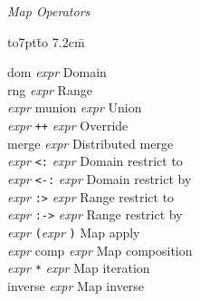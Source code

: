 \documentclass[a4paper]{jsarticle}
\newcommand{\keyw}[1]{{\sf #1}}
\newcommand{\K}[1]{{\sf #1}}
\newcommand{\id}[1]{{\it #1\/}}
\newcommand{\lp}{{\tt(}}
\newcommand{\rp}{{\tt)}}
\newenvironment{tabbingone}[0]{
\begingroup
  \parskip=0pt
  \topsep=0pt
  \partopsep=0pt
  \begin{tabbing}
    \hbox to7pt{}\=%
    \hbox to 7.2cm{}\=%
    \kill
    \+ %
    \kill
}{
  \end{tabbing}
\endgroup}
\begin{document}
\id{Map Operators}
\begin{tabbingone}

      \K{dom} \id{expr}\> Domain    \\%
      \K{rng} \id{expr}\> Range  \\%
      \id{expr} \K{munion} \id{expr}\> Union     \\%
      \id{expr} {\tt++} \id{expr}\> Override\\%
      \K{merge} \id{expr}\> Distributed merge \\%
      \id{expr} {\tt<:} \id{expr}\> Domain restrict to\\%
      \id{expr} {\tt<-:} \id{expr}\> Domain restrict by\\%

     \id{expr} {\tt:>} \id{expr}  \> Range restrict to \\ %
     \id{expr} {\tt:->} \id{expr} \> Range restrict by \\ %
     \id{expr} \lp \id{expr} \rp  \> Map apply \\ %
     \id{expr} \K{comp} \id{expr} \> Map composition \\ %
     \id{expr} {\tt **} \id{expr}       \> Map iteration \\ %
     \K{inverse} \id{expr}     \> Map inverse \\ %
   \end{tabbingone}
   
\end{document}
